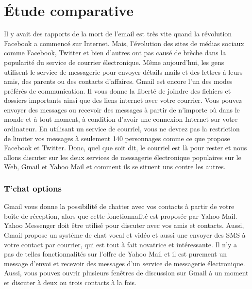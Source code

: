 \documentclass[french]{report}
\begin{document}
\section{\LARGE Étude comparative}
\LARGE Il y avait des rapports de la mort de l'email est très vite quand la révolution Facebook a commencé sur Internet. Mais, l'évolution des sites de médias sociaux comme Facebook, Twitter et bien d'autres ont pas causé de brèche dans la popularité du service de courrier électronique. Même aujourd'hui, les gens utilisent le service de messagerie pour envoyer détails mails et des lettres à leurs amis, des parents ou des contacts d'affaires. Gmail est encore l'un des modes préférés de communication. Il vous donne la liberté de joindre des fichiers et dossiers importants ainsi que des liens internet avec votre courrier. Vous pouvez envoyer des messages ou recevoir des messages à partir de n'importe où dans le monde et à tout moment, à condition d'avoir une connexion Internet sur votre ordinateur. En utilisant un service de courriel, vous ne devrez pas la restriction de limiter vos messages à seulement 140 personnages comme ce que propose Facebook et Twitter. Donc, quel que soit dit, le courriel est là pour rester et nous allons discuter sur les deux services de messagerie électronique populaires sur le Web, Gmail et Yahoo Mail et comment ils se situent uns contre les autres.
\subsubsection{\LARGE T'chat options}
\LARGE Gmail vous donne la possibilité de chatter avec vos contacts à partir de votre boîte de réception, alors que cette fonctionnalité est proposée par Yahoo Mail. Yahoo Messenger doit être utilisé pour discuter avec vos amis et contacts. Aussi, Gmail propose un système de chat vocal et vidéo et aussi une envoyer des SMS à votre contact par courrier, qui est tout à fait novatrice et intéressante. Il n'y a pas de telles fonctionnalités sur l'offre de Yahoo Mail et il est purement un message d'envoi et recevoir des messages d'un service de messagerie électronique. Aussi, vous pouvez ouvrir plusieurs fenêtres de discussion sur Gmail à un moment et discuter à deux ou trois contacts à la fois.
\newpage
\end{document}
